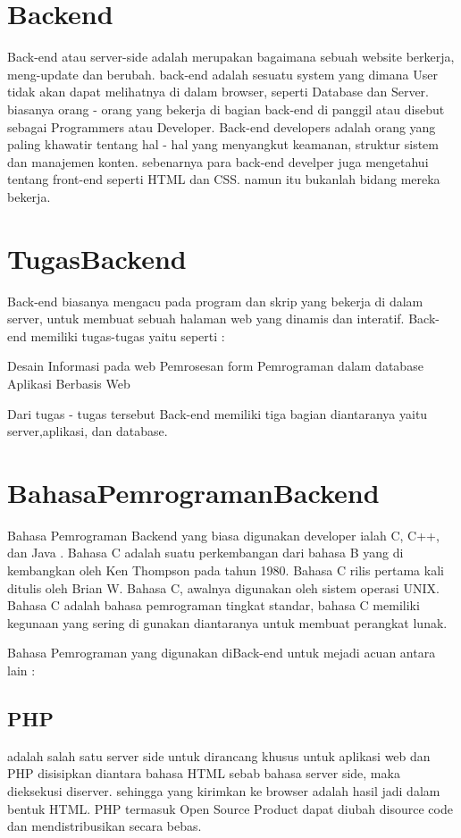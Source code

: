 \section{Backend}
Back-end atau server-side adalah merupakan bagaimana sebuah website berkerja, meng-update
dan berubah. back-end adalah sesuatu system yang dimana User tidak akan dapat melihatnya di dalam browser,
seperti Database dan Server. biasanya orang - orang yang bekerja di bagian back-end di panggil atau disebut sebagai
Programmers atau Developer. Back-end developers adalah orang yang paling khawatir tentang hal - hal yang menyangkut keamanan,
struktur sistem dan manajemen konten. sebenarnya para back-end develper juga mengetahui tentang front-end seperti HTML dan CSS.
namun itu bukanlah bidang mereka bekerja. 

\section{TugasBackend}
Back-end biasanya mengacu pada program dan skrip yang bekerja di dalam server, untuk membuat sebuah halaman web yang dinamis dan interatif. Back-end memiliki tugas-tugas yaitu seperti :

Desain Informasi pada web
Pemrosesan form
Pemrograman dalam database
Aplikasi Berbasis Web

Dari tugas - tugas tersebut Back-end memiliki tiga bagian diantaranya yaitu server,aplikasi, dan database.

\section{BahasaPemrogramanBackend}

Bahasa Pemrograman Backend yang biasa digunakan developer ialah C, C++, dan Java .
Bahasa C adalah suatu perkembangan dari bahasa B yang di kembangkan oleh Ken Thompson pada tahun 1980.
Bahasa C rilis pertama kali ditulis oleh Brian W. Bahasa C, awalnya digunakan oleh sistem operasi UNIX.
Bahasa C adalah bahasa pemrograman tingkat standar, bahasa C memiliki kegunaan yang sering di gunakan
diantaranya untuk membuat perangkat lunak.

Bahasa Pemrograman yang digunakan diBack-end untuk mejadi acuan antara lain :
\subsection {PHP}
 	adalah salah satu server side untuk dirancang khusus untuk aplikasi web dan PHP disisipkan diantara bahasa HTML sebab bahasa server side, maka dieksekusi diserver. sehingga yang kirimkan ke browser adalah hasil jadi dalam bentuk HTML. PHP termasuk Open Source Product dapat diubah disource code dan mendistribusikan secara bebas.

